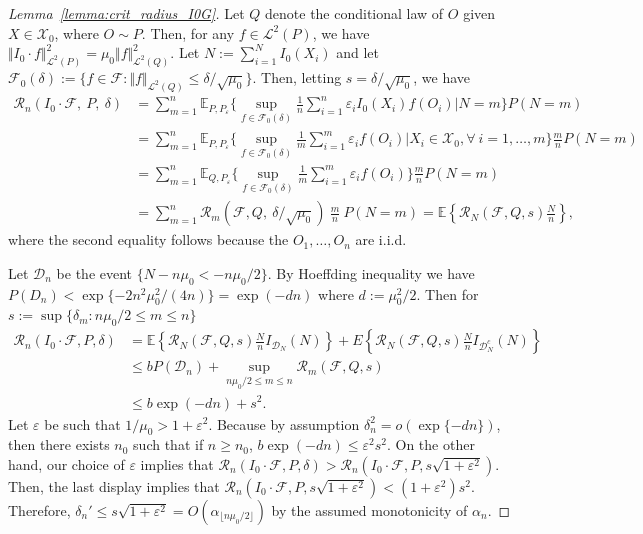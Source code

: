 \documentclass[twoside,11pt]{article}
\newcommand{\E}{\mathbb{E}}
\newcommand{\mc}{\mathcal}
\begin{document}
\begin{proof}[Lemma~\ref{lemma:crit_radius_I0G}] Let $Q$ denote the conditional law of $O$ given $X\in\mc{X}_0$, where $O\sim P$. Then, for any $f\in\mc{L}^2(P)$, we have $\Vert I_0\cdot f\Vert_{\mc{L}^2(P)}^2=\mu_0\Vert f\Vert_{\mc{L}^2(Q)}^2$. Let $N := \sum_{i=1}^N I_0(X_i)$ and let $\mc{F}_0(\delta):=\{f\in\mc{F}:\Vert f\Vert_{\mc{L}^2(Q)}\le\delta/\sqrt{\mu_0}\}$. Then, letting $s=\delta/\sqrt{\mu_0}$, we have
\begin{align*}
   \mc{R}_n(I_0\cdot\mc{F},\:P,\:\delta) 
   &=\sum_{m=1}^n \E_{P,P_\varepsilon}\Big\{\sup_{f\in\mc{F}_0(\delta)}\frac{1}{n}\sum_{i=1}^n\varepsilon_iI_0(X_i)f(O_i)\Big\vert N=m\Big\}P(N=m)\\
     &=\sum_{m=1}^n \E_{P,P_\varepsilon}\Big\{\sup_{f\in\mc{F}_0(\delta)}\frac{1}{m}\sum_{i=1}^m\varepsilon_if(O_i)\Big\vert X_i\in\mc{X}_0,\forall \:i=1,\dots,m\Big\}\frac{m}{n}P(N=m)\\
     &=\sum_{m=1}^n \E_{Q,P_\varepsilon}\Big\{\sup_{f\in\mc{F}_0(\delta)}\frac{1}{m}\sum_{i=1}^m\varepsilon_if(O_i)\Big\}\frac{m}{n}P(N=m)\\
      &=\sum_{m=1}^n \mc{R}_m(\mc{F},Q,\:\delta/\sqrt{\mu_0})\:\frac{m}{n}\:P(N=m)=\E\left\{\mc{R}_N(\mc{F},Q,s)\frac{N}{n}\right\},
\end{align*}
where the second equality follows because the $O_1,\dots,O_n$ are i.i.d.

Let $\mc{D}_n$ be the event $\{N-n\mu_0<-n\mu_0/2\}$. By Hoeffding inequality we have $P(D_n)<\exp\{-2n^2\mu_0^2/(4n)\}=\exp(-dn)$ where $d:=\mu_0^2/2$. 
Then for $s:=\sup\{\delta_m: n\mu_0/2\le m\le n\}$
\begin{align*}
    \mc{R}_n(I_0\cdot\mc{F},P,\delta)&=\E\left\{\mc{R}_N(\mc{F},Q,s)\frac{N}{n}I_{\mc{D}_N}(N)\right\}+E\left\{\mc{R}_N(\mc{F},Q,s)\frac{N}{n}I_{\mc{D}_N^c}(N)\right\}\\
    &\le bP(\mc{D}_n)+\sup_{n\mu_0/2\le m\le n}\mc{R}_m(\mc{F},Q,s)\\
    &\le b\exp(-dn)+s^2.
\end{align*}
Let $\varepsilon$ be such that $1/\mu_0>1+\varepsilon^2$. Because by assumption $\delta_n^2=o(\exp\{-dn\})$, then there exists $n_0$ such that if $n\ge n_0$, $b\exp(-dn)\le\varepsilon^2s^2$. On the other hand, our choice of $\varepsilon$ implies that  $\mc{R}_n(I_0\cdot\mc{F},P,\delta)>\mc{R}_n(I_0\cdot\mc{F},P,s\sqrt{1+\varepsilon^2})$. Then, the last display implies that $\mc{R}_n(I_0\cdot\mc{F},P,s\sqrt{1+\varepsilon^2})<(1+\varepsilon^2)s^2$. Therefore, $\delta_n'\le s\sqrt{1+\varepsilon^2}=O(\alpha_{\lfloor n\mu_0/2\rfloor})$ by the assumed monotonicity of $\alpha_n$.


\end{proof}
\end{document}
